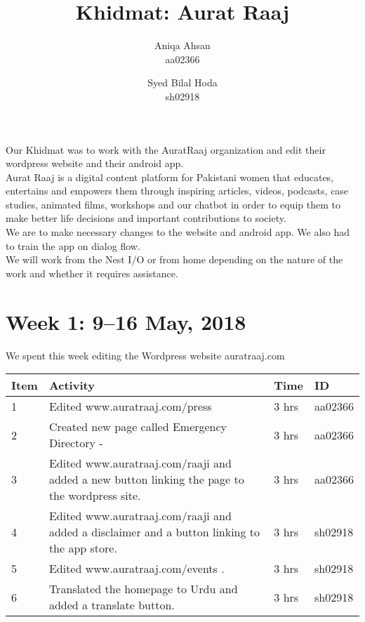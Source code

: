 ﻿\documentclass{article}
\title {Khidmat: Aurat Raaj}
\author{
  Aniqa Ahsan\\ aa02366
  \and
  Syed Bilal Hoda\\ sh02918
}
\date{}
\begin{document}
\maketitle


Our Khidmat was to work with the AuratRaaj organization and edit their wordpress website and their android app. \\

Aurat Raaj is a digital content platform for Pakistani women that educates, entertains and empowers them through inspiring articles, videos, podcasts, case studies, animated films, workshops and our chatbot in order to equip them to make better life decisions and important contributions to society. \\

We are to make necessary changes to the website and android app. We also had to train the app on dialog flow. \\

We will work from the Nest I/O or from home depending on the nature of the work and whether it requires assistance.  \\

\newpage %
\section*{Week 1: 9--16 May, 2018}

We spent this week editing the Wordpress website auratraaj.com

\begin{tabular}{|l|l|l|l|}
  \hline
  Item 	& Activity & Time & ID \\\hline\hline
  1	& Edited www.auratraaj.com/press  & 3 hrs & aa02366 \\\hline
  2	& Created new page called Emergency Directory - & 3 hrs & aa02366 \\\hline
  3	& Edited www.auratraaj.com/raaji and added a new button linking the page to the wordpress site. & 3 hrs & aa02366 \\\hline
  4	& Edited www.auratraaj.com/raaji and added a disclaimer and a button linking to the app store. & 3 hrs & sh02918 
  \\\hline
  5	& Edited www.auratraaj.com/events . & 3 hrs & sh02918 \\\hline
  6	& Translated the homepage to Urdu and added a translate button. & 3 hrs & sh02918 \\\hline
\end{tabular}
\end{document}
